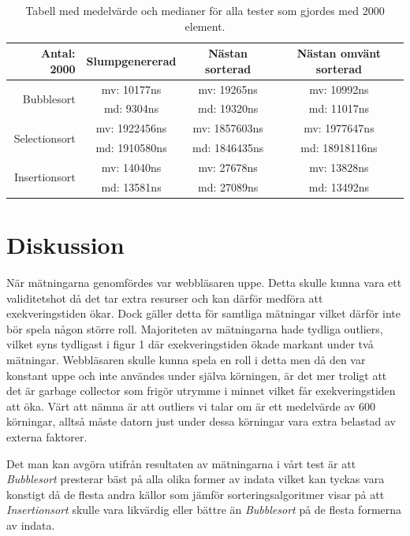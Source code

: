 \documentclass[a4paper]{article}
\begin{document}
\begin{table}[H]
	\begin{tabular}{r|c|c|c|}
		Antal: 2000 & Slumpgenererad & Nästan sorterad & Nästan omvänt sorterad \\ \hline
		\multirow{2}{*}{Bubblesort}    & mv: 10177ns & mv: 19265ns & mv: 10992ns \\
		                               & md: 9304ns & md: 19320ns & md: 11017ns \\ \hline
		\multirow{2}{*}{Selectionsort} & mv: 1922456ns & mv: 1857603ns & mv: 1977647ns \\
		                               & md: 1910580ns & md: 1846435ns & md: 18918116ns \\ \hline
		\multirow{2}{*}{Insertionsort} & mv: 14040ns & mv: 27678ns & mv: 13828ns \\
		                               & md: 13581ns & md: 27089ns & md: 13492ns \\ \hline	
	\end{tabular}
	\caption{Tabell med medelvärde och medianer för alla tester som gjordes med 2000 element.}
	\label{Tabel2000}
\end{table}

\section{Diskussion}
När mätningarna genomfördes var webbläsaren uppe. Detta skulle kunna vara ett validitetshot då det tar extra resurser och kan därför medföra att exekveringstiden ökar. Dock gäller detta för samtliga mätningar vilket därför inte bör spela någon större roll. Majoriteten av mätningarna hade tydliga outliers, vilket syns tydligast i figur 1 där exekveringstiden ökade markant under två mätningar. Webbläsaren skulle kunna spela en roll i detta men då den var konstant uppe och inte användes under själva körningen, är det mer troligt att det är garbage collector som frigör utrymme i minnet vilket får exekveringstiden att öka. Värt att nämna är att outliers vi talar om är ett medelvärde av 600 körningar, alltså måste datorn just under dessa körningar vara extra belastad av externa faktorer.

Det man kan avgöra utifrån resultaten av mätningarna i vårt test är att \emph{Bubblesort} presterar bäst på alla olika former av indata vilket kan tyckas vara konstigt då de flesta andra källor som jämför sorteringsalgoritmer visar på att \emph{Insertionsort} skulle vara likvärdig eller bättre än \emph{Bubblesort} på de flesta formerna av indata.
\end{document}
